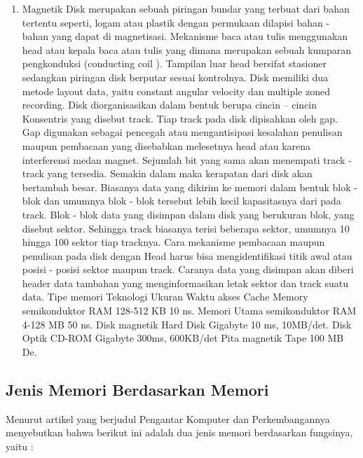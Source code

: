 \begin{enumerate}
\item Magnetik Disk merupakan sebuah piringan bundar yang terbuat dari bahan tertentu seperti, logam atau plastik dengan permukaan dilapisi bahan - bahan yang dapat di magnetisasi. Mekanisme baca atau tulis menggunakan head atau kepala baca atau tulis yang dimana merupakan sebuah kumparan pengkonduksi (conducting coil ). Tampilan luar head bersifat stasioner sedangkan piringan disk berputar sesuai kontrolnya. Disk memiliki dua metode layout data, yaitu  constant angular velocity dan multiple zoned recording. Disk diorganisasikan dalam bentuk berupa cincin – cincin
Konsentris yang disebut track. Tiap track pada disk dipisahkan oleh gap. Gap digunakan sebagai pencegah atau mengantisipasi kesalahan penulisan maupun pembacaan yang disebabkan melesetnya head atau karena interferensi medan magnet. Sejumlah bit yang sama akan menempati track - track yang tersedia. Semakin dalam maka kerapatan dari disk akan bertambah besar. Biasanya data yang dikirim ke memori dalam bentuk blok - blok dan umumnya blok - blok tersebut lebih kecil kapasitasnya dari pada track. Blok - blok data yang disimpan dalam disk yang berukuran blok, yang disebut sektor. Sehingga track biasanya terisi beberapa sektor, umumnya 10 hingga 100 sektor tiap tracknya. Cara mekanisme pembacaan maupun penulisan pada disk dengan Head harus bisa mengidentifikasi titik awal atau posisi - posisi sektor maupun track. Caranya data yang disimpan akan diberi header data tambahan yang menginformasikan letak sektor dan track suatu data. Tipe memori Teknologi Ukuran Waktu akses Cache Memory semikonduktor RAM 128-512 KB 10 ns. Memori Utama semikonduktor RAM 4-128 MB 50 ns. Disk magnetik Hard Disk Gigabyte 10 ms, 10MB/det. Disk Optik CD-ROM Gigabyte 300ms, 600KB/det Pita magnetik Tape 100 MB De.

\end{enumerate}

\subsection {Jenis Memori Berdasarkan Memori}


Menurut artikel yang berjudul Pengantar Komputer dan Perkembangannya menyebutkan bahwa berikut ini adalah dua jenis memori berdasarkan fungsinya, yaitu :

